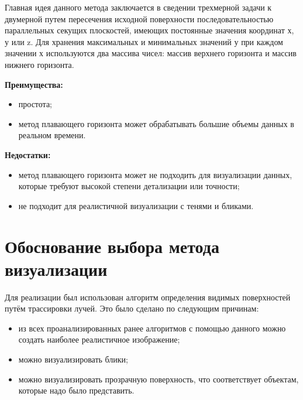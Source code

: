 Главная идея данного метода заключается в сведении трехмерной задачи к двумерной путем пересечения исходной поверхности последовательностью параллельных секущих плоскостей, имеющих постоянные значения координат х, у или z. Для хранения максимальных и минимальных значений у при каждом значении х используются два массива чисел: массив верхнего горизонта и массив нижнего горизонта.

\textbf{Преимущества:}
\begin{itemize}
	\item простота;
	\item метод плавающего горизонта может обрабатывать большие объемы данных в реальном времени.
\end{itemize}

\textbf{Недостатки:}
\begin{itemize}
	\item метод плавающего горизонта может не подходить для визуализации данных, которые требуют высокой степени детализации или точности;
	\item не подходит для реалистичной визуализации с тенями и бликами.
\end{itemize}

\section{Обоснование выбора метода визуализации}
Для реализации был использован алгоритм определения видимых поверхностей путём трассировки лучей. Это было сделано по следующим причинам:
\begin{itemize}
	\item из всех проанализированных ранее алгоритмов с помощью данного можно создать наиболее реалистичное изображение;
	\item можно визуализировать блики;
	\item можно визуализировать прозрачную поверхность, что соответствует объектам, которые надо было представить.
\end{itemize}
\clearpage
